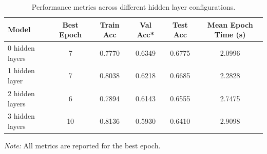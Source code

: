 \documentclass[11pt]{article}
\begin{document}
\begin{table}[htbp]
\centering
\begin{tabular}{l c c c c c}
\hline
\textbf{Model} & \textbf{Best Epoch} & \textbf{Train Acc} & \textbf{Val Acc*} & \textbf{Test Acc} & \textbf{Mean Epoch Time (s)} \\
\hline
0 hidden layers & 7 & 0.7770 & 0.6349 & 0.6775 & 2.0996 \\
1 hidden layer  & 7 & 0.8038 & 0.6218 & 0.6685 & 2.2828 \\
2 hidden layers & 6 & 0.7894 & 0.6143 & 0.6555 & 2.7475 \\
3 hidden layers & 10 & 0.8136 & 0.5930 & 0.6410 & 2.9098 \\
\hline
\end{tabular}
\caption{Performance metrics across different hidden layer configurations.}
\label{tab:model_performance_2}
\footnotesize{\textit{Note:} All metrics are reported for the best epoch.}
\end{table}
\end{document}
